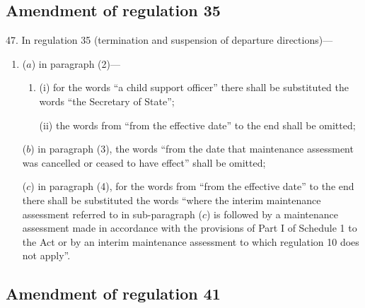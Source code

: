 \documentclass[12pt,a4paper]{article}
\begin{document}

%

\subsection[47. Amendment of regulation 35]{Amendment of regulation 35}

47.  In regulation 35 (termination and suspension of departure directions)---
\begin{enumerate}\item[]
($a$) in paragraph (2)---
\begin{enumerate}\item[]
(i) for the words “a child support officer” there shall be substituted the words “the Secretary of State”;

(ii) the words from “from the effective date” to the end shall be omitted;
\end{enumerate}

($b$) in paragraph (3), the words “from the date that maintenance assessment was cancelled or ceased to have effect” shall be omitted;

($c$) in paragraph (4), for the words from “from the effective date” to the end there shall be substituted the words “where the interim maintenance assessment referred to in sub-paragraph ($c$) is followed by a maintenance assessment made in accordance with the provisions of Part I of Schedule 1 to the Act or by an interim maintenance assessment to which regulation 10 does not apply”.
\end{enumerate}

\subsection[48. Amendment of regulation 41]{Amendment of regulation 41}
\end{document}
